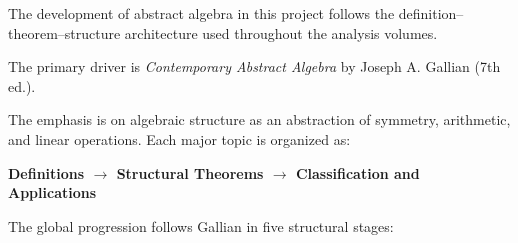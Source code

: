 The development of abstract algebra in this project follows
the definition--theorem--structure architecture used
throughout the analysis volumes.

The primary driver is \textit{Contemporary Abstract Algebra}
by Joseph A. Gallian (7th ed.).

The emphasis is on algebraic structure as an abstraction of
symmetry, arithmetic, and linear operations.
Each major topic is organized as:

\begin{center}
\textbf{Definitions $\longrightarrow$ Structural Theorems $\longrightarrow$ Classification and Applications}
\end{center}

The global progression follows Gallian in five structural stages:


